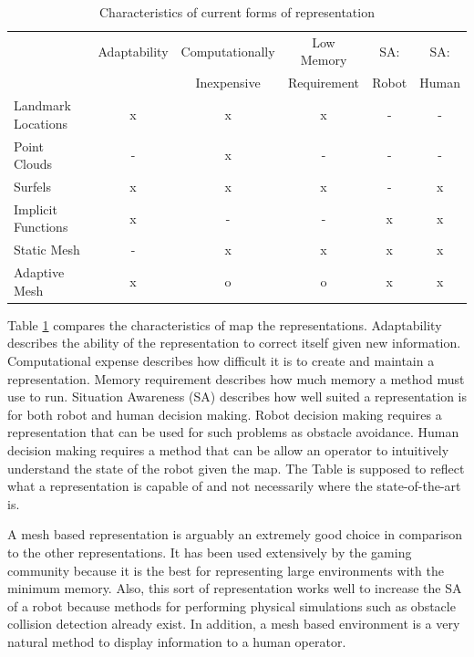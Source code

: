 \begin{table}[h]
\begin{footnotesize}
\begin{center}
\begin{tabular}{|l|c|c|c|c|c|}
\hline
\multirow{2}{*}{} & Adaptability & Computationally & Low Memory & SA: & SA: \\
 & & Inexpensive & Requirement & Robot & Human \\\hline
Landmark Locations  	& x & x & x & - & - \\
Point Clouds		& - & x & - & - & - \\
Surfels             	& x & x & x & - & x \\
Implicit Functions 	& x & - & - & x & x \\
Static Mesh	 	& - & x & x & x & x \\
Adaptive Mesh	 	& x & o & o & x & x \\
\hline
\end{tabular}
\end{center}
\end{footnotesize}
\caption{Characteristics of current forms of representation}
\label{tab:rep}
\end{table}

Table \ref{tab:rep} compares the characteristics of map the
representations. Adaptability describes the ability of the representation
to correct itself given new information. Computational expense describes
how difficult it is to create and maintain a representation.  Memory
requirement describes how much memory a method must use to run.  Situation
Awareness (SA) describes how well suited a representation is for both robot
and human decision making. Robot decision making requires a representation
that can be used for such problems as obstacle avoidance. Human decision
making requires a method that can be allow an operator to intuitively
understand the state of the robot given the map. The Table is supposed to
reflect what a representation is capable of and not necessarily where the
state-of-the-art is.

A mesh based representation is arguably an extremely good choice in
comparison to the other representations. It has been used extensively by
the gaming community because it is the best for representing large
environments with the minimum memory. Also, this sort of representation
works well to increase the SA of a robot because methods for performing
physical simulations such as obstacle collision detection already exist. In
addition, a mesh based environment is a very natural method to display
information to a human operator.

